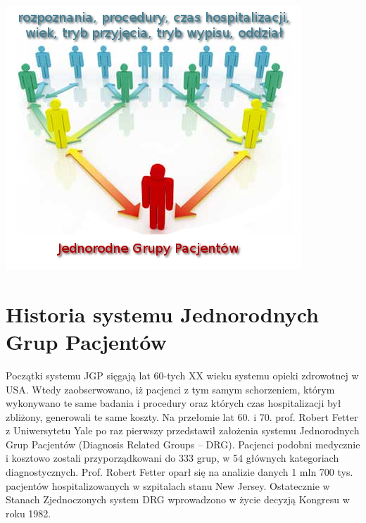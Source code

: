 \vspace*{1cm}
\includegraphics{images/standarization}


\section{Historia systemu Jednorodnych Grup Pacjentów}
\label{sec:historiaJGP}

Początki systemu JGP sięgają lat 60-tych XX wieku systemu opieki zdrowotnej w USA. Wtedy zaobserwowano, iż pacjenci z tym samym schorzeniem, którym wykonywano te same badania i procedury oraz których czas hospitalizacji był zbliżony, generowali te same koszty. Na przełomie lat 60. i 70. prof. Robert Fetter z Uniwersytetu Yale po raz pierwszy przedstawił założenia systemu Jednorodnych Grup Pacjentów (Diagnosis Related Groups – DRG). Pacjenci podobni medycznie i kosztowo zostali przyporządkowani do 333 grup, w 54 głównych kategoriach diagnostycznych. Prof. Robert Fetter oparł się na analizie danych 1 mln 700 tys. pacjentów hospitalizowanych w szpitalach stanu New Jersey. Ostatecznie w Stanach Zjednoczonych system DRG wprowadzono w życie decyzją Kongresu w roku 1982.

